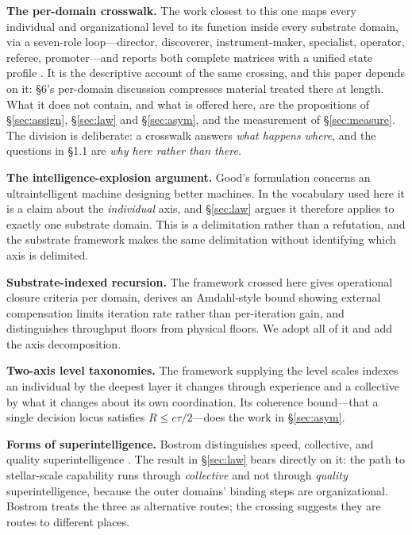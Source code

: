 \documentclass[11pt]{article}
\begin{document}
\textbf{The per-domain crosswalk.} The work closest to this one maps every individual and organizational level to its function inside every substrate domain, via a seven-role loop---director, discoverer, instrument-maker, specialist, operator, referee, promoter---and reports both complete matrices with a unified state profile \citep{yang2026circles}. It is the descriptive account of the same crossing, and this paper depends on it: \S6's per-domain discussion compresses material treated there at length. What it does not contain, and what is offered here, are the propositions of \S\ref{sec:assign}, \S\ref{sec:law} and \S\ref{sec:asym}, and the measurement of \S\ref{sec:measure}. The division is deliberate: a crosswalk answers \emph{what happens where}, and the questions in \S1.1 are \emph{why here rather than there}.

\textbf{The intelligence-explosion argument.} Good's formulation concerns an ultraintelligent machine designing better machines. In the vocabulary used here it is a claim about the \emph{individual} axis, and \S\ref{sec:law} argues it therefore applies to exactly one substrate domain. This is a delimitation rather than a refutation, and the substrate framework makes the same delimitation without identifying which axis is delimited.

\textbf{Substrate-indexed recursion.} The framework crossed here gives operational closure criteria per domain, derives an Amdahl-style bound \citep{amdahl1967validity} showing external compensation limits iteration rate rather than per-iteration gain, and distinguishes throughput floors from physical floors. We adopt all of it and add the axis decomposition.

\textbf{Two-axis level taxonomies.} The framework supplying the level scales indexes an individual by the deepest layer it changes through experience and a collective by what it changes about its own coordination. Its coherence bound---that a single decision locus satisfies $R \le c\tau/2$---does the work in \S\ref{sec:asym}.

\textbf{Forms of superintelligence.} Bostrom distinguishes speed, collective, and quality superintelligence \citep{bostrom2014superintelligence}. The result in \S\ref{sec:law} bears directly on it: the path to stellar-scale capability runs through \emph{collective} and not through \emph{quality} superintelligence, because the outer domains' binding steps are organizational. Bostrom treats the three as alternative routes; the crossing suggests they are routes to different places.
\end{document}
